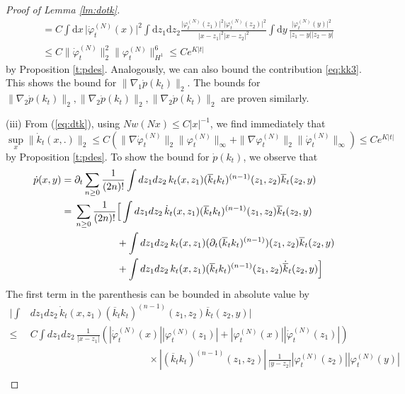 \documentclass[11pt,a4paper,DIV11]{scrartcl}	%
\newcommand{\di}{\textrm{d}}		%
\newcommand{\ph}{\varphi_t^{(N)}}	%
\newcommand{\phdot}{\dot{\varphi}_t^{(N)}}	%
\begin{document}
\begin{proof}[Proof of Lemma \ref{lm:dotk}]
\begin{align*}
& = C \int \di x\, \lvert\phdot(x)\rvert^2 \int \di z_1 \di z_2 \frac{\lvert \ph(z_1)\rvert^2 \lvert \ph(z_2)\rvert^2}{\lvert x-z_1\rvert^2 \lvert x-z_2\rvert^2} \int \di y \, \frac{\lvert \ph(y)\rvert^2}{\lvert z_1-y\rvert \lvert z_2 - y\rvert} \\ &\leq C \| \phdot \|_2^2 \| \ph \|_{H^1}^6 \leq C e^{K|t|}
 \end{align*}
 by Proposition \ref{t:pdes}. Analogously, we can also bound the contribution \eqref{eq:kk3}. 
This shows the bound for $\| \nabla_1 \dot p (k_t) \|_2$. The bounds for $\| \nabla_2 \dot p (k_t) \|_2,\| \nabla_2 \dot p (k_t) \|_2, \| \nabla_2 \dot p (k_t) \|_2$ are proven similarly.

(iii)  {F}rom (\ref{eq:dtk}), using $N w(Nx) \leq C|x|^{-1}$, we find immediately that
\[ \sup_x \| \dot{k}_t (x,.) \|_2 \leq C \left(\| \nabla \phdot \|_2 \| \ph \|_\infty + \| \nabla \ph \|_2 \|\phdot\|_\infty \right) \leq C e^{K|t|} \]
by Proposition \ref{t:pdes}. To show the bound for $\dot{p} (k_t)$, we observe that
\begin{equation}\label{eq:px2} \begin{split}
\dot{p}(x,y) = \; & \partial_t \sum_{n \geq 0}\frac{1}{(2n)!} \int dz_1 dz_2 \, k_t (x,z_1) (\overline{k}_t k_t)^{(n-1)} (z_1 ,z_2) \overline{k}_t (z_2 ,y ) \\ = \;& \sum_{n \geq 0}\frac{1}{(2n)!} \Big[  \int dz_1 dz_2 \, \dot{k}_t (x,z_1) (\overline{k}_t k_t)^{(n-1)} (z_1 ,z_2) \overline{k}_t (z_2 ,y ) \\ &\hspace{1.5cm} +
 \int dz_1 dz_2 \, k_t (x,z_1) (\partial_t (\overline{k}_t k_t)^{(n-1)}) (z_1 ,z_2) \overline{k}_t (z_2 ,y )\\
  &\hspace{1.5cm} + \int dz_1 dz_2 \, k_t (x,z_1) (\overline{k}_t k_t)^{(n-1)} (z_1 ,z_2) \dot{\overline{k}}_t (z_2 ,y ) \Big]  \end{split} \end{equation}
The first term in the parenthesis can be bounded in absolute value by
\[ \begin{split} 
\Big| \int &dz_1 dz_2 \, \dot{k}_t (x,z_1) (\overline{k}_t k_t)^{(n-1)} (z_1 ,z_2) \overline{k}_t (z_2 ,y ) \Big| \\ \leq \; &C \int dz_1 dz_2 \, \frac{1}{|x-z_1|} \left( |\phdot (x)| |\ph (z_1)|+ |\ph (x)| |\phdot (z_1)| \right)  \\ &\hspace{5cm} \times | (\overline{k}_t k_t)^{(n-1)} (z_1 ,z_2)| \, \frac{1}{|y-z_2|} |\ph (z_2)| |\ph (y)| \\

\end{split}\]
\end{proof}
\end{document}

